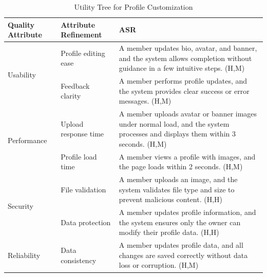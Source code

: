 \documentclass{article}
\begin{document}
\begin{table}[H]
    \centering
    \caption{Utility Tree for Profile Customization}
    \begin{tabular}{|p{3cm}|p{4cm}|p{7cm}|}
        \hline
        \textbf{Quality Attribute} & \textbf{Attribute Refinement}                                                                                                  & \textbf{ASR} \\
        \hline

        \multirow{2}{*}{Usability}
                                   & Profile editing ease
                                   & A member updates bio, avatar, and banner, and the system allows completion without guidance in a few intuitive steps. (H,M)                   \\
        \cline{2-3}
                                   & Feedback clarity
                                   & A member performs profile updates, and the system provides clear success or error messages. (H,M)                                             \\
        \hline

        \multirow{2}{*}{Performance}
                                   & Upload response time
                                   & A member uploads avatar or banner images under normal load, and the system processes and displays them within 3 seconds. (H,M)                \\
        \cline{2-3}
                                   & Profile load time
                                   & A member views a profile with images, and the page loads within 2 seconds. (H,M)                                                              \\
        \hline

        \multirow{2}{*}{Security}
                                   & File validation
                                   & A member uploads an image, and the system validates file type and size to prevent malicious content. (H,H)                                    \\
        \cline{2-3}
                                   & Data protection
                                   & A member updates profile information, and the system ensures only the owner can modify their profile data. (H,H)                              \\
        \hline

        Reliability
                                   & Data consistency
                                   & A member updates profile data, and all changes are saved correctly without data loss or corruption. (H,M)                                     \\
        \hline


\end{tabular}
\end{table}
\end{document}
